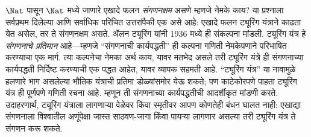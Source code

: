 \documentclass[../../../include/open-logic-section]{subfiles}
\begin{document}

$\Nat$ पासून $\Nat$ मध्ये जाणारे एखादे फलन \emph{संगणनक्षम} असणे म्हणजे
नेमके काय? या प्रश्नाला सर्वप्रथम दिलेल्या आणि सर्वाधिक परिचित
उत्तरांपैकी एक असे आहे: एखादे फलन ट्यूरिंग यंत्राने काढता येत असेल, तर ते
संगणनक्षम असते. ॲलन ट्यूरिंग यांनी 1936 मध्ये ही संकल्पना मांडली.
ट्यूरिंग यंत्र हे \emph{संगणनाचे प्रतिमान} आहे---म्हणजे ``संगणनाची
कार्यपद्धती'' ही कल्पना गणिती नेमकेपणाने परिभाषित करण्याचा एक मार्ग.
त्या कल्पनेचा नेमका अर्थ काय, यावर मतभेद असले तरी ट्यूरिंग यंत्रे ही
संगणनाच्या कार्यपद्धती निर्दिष्ट करण्याची एक पद्धत आहेत, यावर व्यापक
सहमती आहे. ``ट्यूरिंग यंत्र'' या नावामुळे हलणारे भाग असलेल्या भौतिक
यंत्राची प्रतिमा डोळ्यांसमोर येऊ शकते; पण काटेकोरपणे पाहता ट्यूरिंग
यंत्र ही पूर्णपणे गणिती रचना आहे. म्हणून ती संगणनाच्या कार्यपद्धतीची
आदर्शीकृत मांडणी करते. उदाहरणार्थ, ट्यूरिंग यंत्राला लागणाऱ्या वेळेवर
किंवा स्मृतीवर आपण कोणतेही बंधन घालत नाही: एखाद्या संगणनाला विश्वातील
अणूंपेक्षा जास्त साठवण-जागा किंवा पायऱ्या लागणार असल्या तरी ट्यूरिंग
यंत्र ते संगणन करू शकते.
\end{document}
